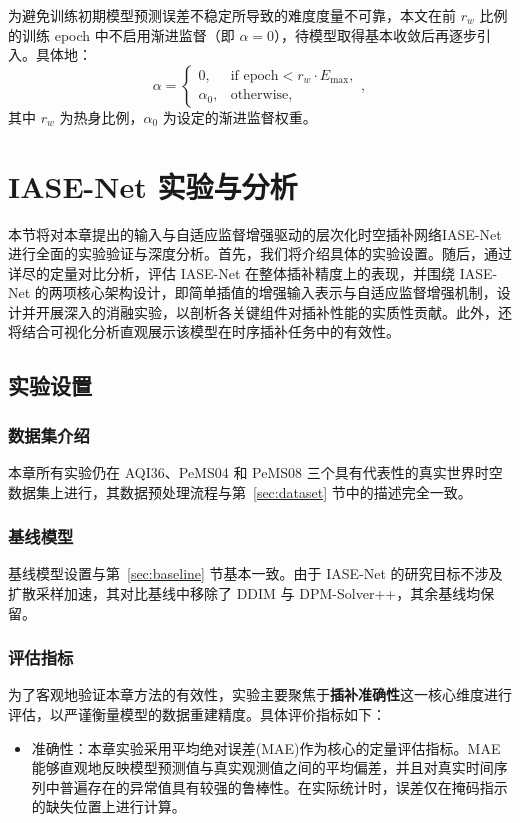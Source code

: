 为避免训练初期模型预测误差不稳定所导致的难度度量不可靠，本文在前 $r_w$ 比例的训练 epoch 中不启用渐进监督（即 $\alpha=0$），待模型取得基本收敛后再逐步引入。具体地：
\begin{equation}
\alpha = \begin{cases}
0, & \text{if } \mathrm{epoch} < r_w \cdot E_{\max}, \\
\alpha_0, & \text{otherwise},
\end{cases},
\end{equation}
其中 $r_w$ 为热身比例，$\alpha_0$ 为设定的渐进监督权重。
    
 \section{IASE-Net 实验与分析} 

本节将对本章提出的输入与自适应监督增强驱动的层次化时空插补网络IASE-Net进行全面的实验验证与深度分析。首先，我们将介绍具体的实验设置。随后，通过详尽的定量对比分析，评估 IASE-Net 在整体插补精度上的表现，并围绕 IASE-Net 的两项核心架构设计，即简单插值的增强输入表示与自适应监督增强机制，设计并开展深入的消融实验，以剖析各关键组件对插补性能的实质性贡献。此外，还将结合可视化分析直观展示该模型在时序插补任务中的有效性。

\subsection{实验设置}


\subsubsection{数据集介绍}
本章所有实验仍在 \textsf{AQI36}、\textsf{PeMS04} 和 \textsf{PeMS08} 三个具有代表性的真实世界时空数据集上进行，其数据预处理流程与第~\ref{sec:dataset} 节中的描述完全一致。


\subsubsection{基线模型}
基线模型设置与第~\ref{sec:baseline} 节基本一致。由于 IASE-Net 的研究目标不涉及扩散采样加速，其对比基线中移除了 DDIM 与 DPM-Solver++，其余基线均保留。

\subsubsection{评估指标}
为了客观地验证本章方法的有效性，实验主要聚焦于\textbf{插补准确性}这一核心维度进行评估，以严谨衡量模型的数据重建精度。具体评价指标如下：
\begin{itemize}[noitemsep, topsep=0pt, partopsep=0pt, parsep=0pt, leftmargin=*]
\item 准确性：本章实验采用平均绝对误差(MAE)作为核心的定量评估指标。MAE 能够直观地反映模型预测值与真实观测值之间的平均偏差，并且对真实时间序列中普遍存在的异常值具有较强的鲁棒性。在实际统计时，误差仅在掩码指示的缺失位置上进行计算。
\end{itemize}

